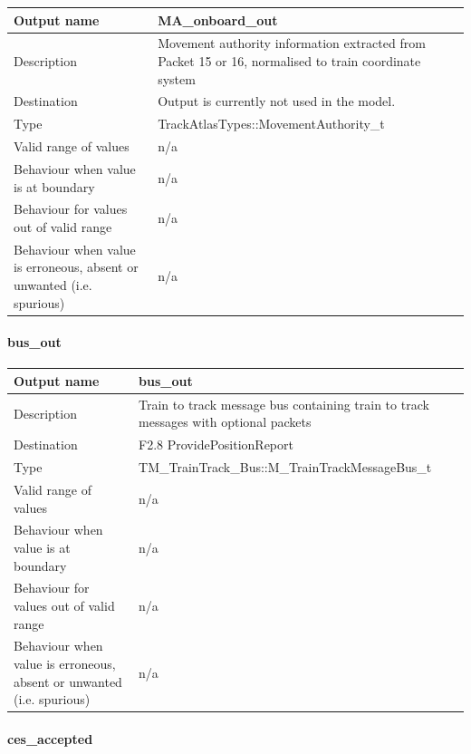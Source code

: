 \begin{longtable}{p{}p{}}
\toprule
Output name				& MA\_onboard\_out \\
\midrule
Description				& Movement authority information extracted from Packet 15 or 16, normalised to train coordinate system\\
\midrule
Destination				& Output is currently not used in the model.  \\ 
\midrule
Type					& TrackAtlasTypes::MovementAuthority\_t\\
\midrule
Valid range of values	& n/a \\
\midrule
Behaviour when value is at boundary	& n/a  \\
\midrule
Behaviour for values out of valid range	& n/a  \\
\midrule
Behaviour when value is erroneous, absent or unwanted (i.e. spurious) & n/a  \\
\bottomrule
\end{longtable}

\paragraph{bus\_out}

\begin{longtable}{p{}p{}}
\toprule
Output name				& bus\_out \\
\midrule
Description				& Train to track message bus containing train to track messages with optional packets \\
\midrule
Destination				& F2.8 ProvidePositionReport  \\ 
\midrule
Type					& TM\_TrainTrack\_Bus::M\_TrainTrackMessageBus\_t\\
\midrule
Valid range of values	& n/a \\
\midrule
Behaviour when value is at boundary	& n/a  \\
\midrule
Behaviour for values out of valid range	& n/a  \\
\midrule
Behaviour when value is erroneous, absent or unwanted (i.e. spurious) & n/a  \\
\bottomrule
\end{longtable}

\paragraph{ces\_accepted}

